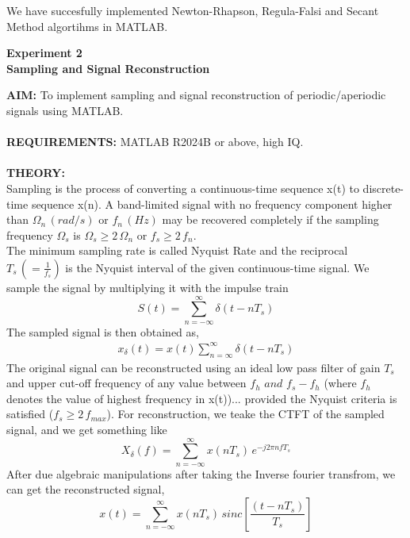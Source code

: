 \documentclass[12pt]{report}
\begin{document}
  We have succesfully implemented Newton-Rhapson, Regula-Falsi and Secant Method algortihms in MATLAB.

  \newpage 
  \begin{center}
    \textbf{\LARGE Experiment 2} \\
    \vspace{0.2cm}
    \textbf{\large Sampling and Signal Reconstruction}
  \end{center}

  \noindent \textbf{AIM:} To implement sampling and signal reconstruction of periodic/aperiodic signals using MATLAB. \\ \\
  \textbf{REQUIREMENTS:} MATLAB R2024B or above, high IQ. \\ \\
  \textbf{THEORY:} \\
  Sampling is the process of converting a continuous-time sequence x(t) to discrete-time sequence x(n). A band-limited signal with no frequency component higher than $\Omega_{n} \, (rad/s)$ or $f_n \, (Hz)$ may be recovered completely if the sampling frequency $\Omega_{s}$ is $\Omega_{s} \geq 2 \, \Omega_{n}$ or $f_{s} \geq 2\, f_{n}$. \cite{profnotes} \\

  The minimum sampling rate is called Nyquist Rate and the reciprocal $T_{s} \, (= \frac{1}{f_{s}})$ is the Nyquist interval of the given continuous-time signal. We sample the signal by multiplying it with the impulse train \[ S(t) = \sum_{n = -\infty}^{\infty} \delta (t - n T_{s}) \] The sampled signal is then obtained as, \cite{profnotes}
  \[\begin{aligned}
    x_{\delta}(t) = x(t) \sum_{n = \infty}^{\infty} \delta(t - nT_{s})
  \end{aligned} \]  The original signal can be reconstructed using an ideal low pass filter of gain $T_{s}$ and upper cut-off frequency of any value between $f_h \,\, and \,\, f_s - f_h $ (where $f_h$ denotes the value of highest frequency in x(t))... provided the Nyquist criteria is satisfied ($f_{s} \geq 2 \, f_{max}$). For reconstruction, we teake the CTFT of the sampled signal, and we get something like \[ X_{\delta}(f) = \sum_{n=-\infty}^{\infty} x(nT_{s}) \, e^{-j 2 \pi n f T_{s}} \] After due algebraic manipulations after taking the Inverse fourier transfrom, we can get the reconstructed signal, \cite{profnotes} \[ x(t) = \sum_{n = -\infty}^{\infty} x(n T_{s}) \, sinc \left[ \frac{(t - nT_s)}{T_s} \right] \]
\end{document}
